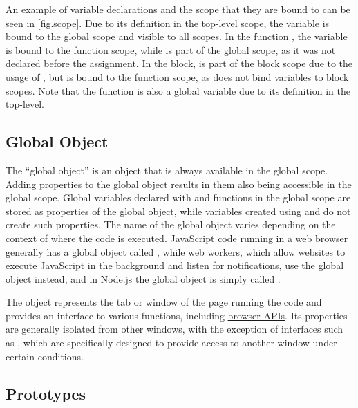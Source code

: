 An example of variable declarations and the scope that they are bound to can be seen in \autoref{fig.scope}. Due to its definition in the top-level scope, the variable  is bound to the global scope and visible to all scopes. In the function , the variable  is bound to the function scope, while  is part of the global scope, as it was not declared before the assignment. In the  block,  is part of the block scope due to the usage of , but  is bound to the function scope, as  does not bind variables to block scopes. Note that the function  is also a global variable due to its definition in the top-level.



\subsection{Global Object}
\label{sec.globals}

The “global object” is an object that is always available in the global scope. Adding properties to the global object results in them also being accessible in the global scope. Global variables declared with  and functions in the global scope are stored as properties of the global object, while variables created using  and  do not create such properties. The name of the global object varies depending on the context of where the code is executed. JavaScript code running in a web browser generally has a global object called , while web workers, which allow websites to execute JavaScript in the background and listen for notifications, use the global object  instead, and in Node.js the global object is simply called . \cite{MozGlobal}

The  object represents the tab or window of the page running the code and provides an interface to various functions, including \hyperref[sec.browserAPIs]{browser APIs}. Its properties are generally isolated from other windows, with the exception of interfaces such as , which are specifically designed to provide access to another window under certain conditions. \cite{MozWindow}



\subsection{Prototypes}
\label{sec.prototypes}

